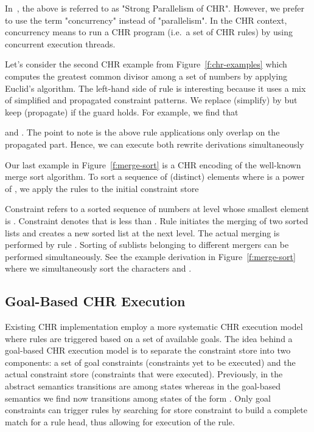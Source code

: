 \documentclass{tlp}
\begin{document}
In~\cite{union-find}, the above is referred to as "Strong Parallelism of CHR".
However, we prefer to use the term "concurrency" instead of "parallelism".
In the CHR context, concurrency means to run a CHR program (i.e.~a set of CHR rules)
by using concurrent execution threads.

Let's consider the second CHR example from Figure~\ref{f:chr-examples}  
which computes the greatest common divisor among a set of numbers
by applying Euclid's algorithm. 
The left-hand side of rule  is interesting
because it uses a mix of simplified and propagated constraint patterns.
We replace (simplify)  by  but keep (propagate) 
if the guard  holds.
For example, we find that

and  .
The point to note is the above rule applications only overlap on the propagated part.
Hence, we can execute both rewrite derivations simultaneously


Our last example in Figure~\ref{f:merge-sort} is a CHR encoding of the well-known merge sort algorithm.
To sort a sequence of (distinct) elements  where
 is a power of , we apply the rules to
the initial constraint store 

Constraint  refers to a sorted sequence of numbers at level  whose smallest
element is . Constraint  denotes that  is less than .
Rule  initiates the merging of two sorted lists and creates
a new sorted list at the next level. The actual merging
is performed by rule .
Sorting of sublists belonging to different mergers can be performed simultaneously.
See the example derivation in Figure~\ref{f:merge-sort} where
we simultaneously sort the characters  and .

\subsection{Goal-Based CHR Execution}

Existing CHR implementation employ a more systematic
CHR execution model where rules are triggered based on a set of available goals.
The idea behind a goal-based CHR execution model is  
to separate the constraint store  into
two components: a set of goal constraints (constraints yet to be executed)
and the actual constraint store (constraints that were executed). 
Previously, in the abstract semantics transitions  are among
states  whereas in the goal-based semantics we find now transitions
 among states of the form .
Only goal constraints can trigger rules by 
searching for store constraint to build a complete match for a rule head, thus 
allowing for execution of the rule.
\end{document}
